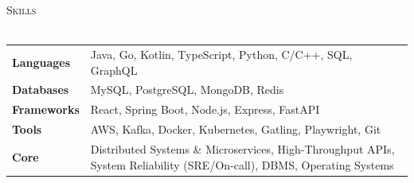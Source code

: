 \documentclass[a4paper]{article}
\newcommand{\bulletSep} { \vspace{1.3mm} }
\newcommand{\sectionSep} { \vspace{3.5mm} }
\newcommand{\lineunder} {
    \vspace*{-8pt} \\
    \hspace*{-15pt} \hrulefill \\
}
\newcommand{\header} [1] {
    {\hspace*{-18pt}\vspace*{6pt} {
        \fontfamily{qcs}\selectfont \large \scshape #1
    }}
    \vspace*{-6pt} \lineunder
    \vspace{1.1mm}
}
\newcommand{\volunteerItem}[5]{
    \textbf{#1} -- \textit{#2} \hfill #3 \\
    \begin{itemize}
        #4
    \end{itemize}
}
\begin{document}






\sectionSep

\header{Skills}
{\renewcommand{\arraystretch}{1.08}
\begin{tabularx}{\textwidth}{@{}l X@{}}
    \textbf{Languages}  & Java, Go, Kotlin, TypeScript, Python, C/C++, SQL, GraphQL \\
    \textbf{Databases}  & MySQL, PostgreSQL, MongoDB, Redis \\
    \textbf{Frameworks} & React, Spring Boot, Node.js, Express, FastAPI \\
    \textbf{Tools}      & AWS, Kafka, Docker, Kubernetes, Gatling, Playwright, Git \\
    \textbf{Core}       & Distributed Systems \& Microservices, High-Throughput APIs, System Reliability (SRE/On-call), DBMS, Operating Systems \\
\end{tabularx}
}
\end{document}
